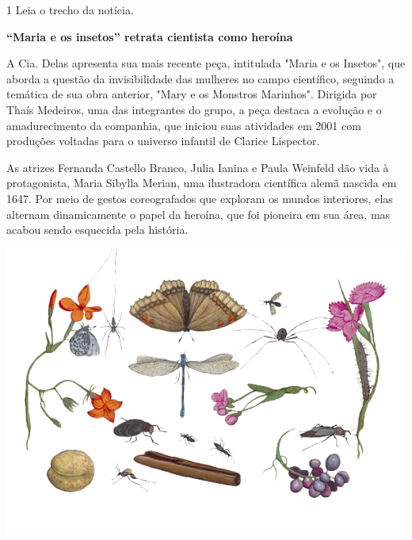 

\num{1} Leia o trecho da notícia.

\begin{myquote}

\textbf{``Maria e os insetos'' retrata cientista como heroína}

A Cia. Delas apresenta sua mais recente peça, intitulada "Maria e os Insetos", que aborda a questão da invisibilidade das mulheres no campo científico, seguindo a temática de sua obra anterior, "Mary e os Monstros Marinhos". Dirigida por Thaís Medeiros, uma das integrantes do grupo, a peça destaca a evolução e o amadurecimento da companhia, que iniciou suas atividades em 2001 com produções voltadas para o universo infantil de Clarice Lispector.

As atrizes Fernanda Castello Branco, Julia Ianina e Paula Weinfeld dão vida à protagonista, Maria Sibylla Merian, uma ilustradora científica alemã nascida em 1647. Por meio de gestos coreografados que exploram os mundos interiores, elas alternam dinamicamente o papel da heroína, que foi pioneira em sua área, mas acabou sendo esquecida pela história.

\begin{center}
\includegraphics[width=\textwidth]{./media/image23e.png}
\end{center}

\end{myquote}

